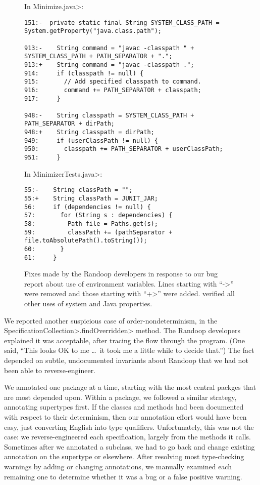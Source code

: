 \begin{figure}

\noindent
In \<Minimize.java>:

\begin{Verbatim}
151:-  private static final String SYSTEM_CLASS_PATH = System.getProperty("java.class.path");

913:-    String command = "javac -classpath " + SYSTEM_CLASS_PATH + PATH_SEPARATOR + ".";
913:+    String command = "javac -classpath .";
914:     if (classpath != null) {
915:       // Add specified classpath to command.
916:       command += PATH_SEPARATOR + classpath;
917:     }

948:-    String classpath = SYSTEM_CLASS_PATH + PATH_SEPARATOR + dirPath;
948:+    String classpath = dirPath;
949:     if (userClassPath != null) {
950:       classpath += PATH_SEPARATOR + userClassPath;
951:     }
\end{Verbatim}

\noindent
In \<MinimizerTests.java>:

\begin{Verbatim}
55:-    String classPath = "";
55:+    String classPath = JUNIT_JAR;
56:     if (dependencies != null) {
57:       for (String s : dependencies) {
58:         Path file = Paths.get(s);
59:         classPath += (pathSeparator + file.toAbsolutePath().toString());
60:       }
61:     }
\end{Verbatim}

\caption{Fixes made by the Randoop developers in response to our bug report
  about use of environment variables.  Lines starting with ``\<->'' were
  removed and those starting with ``\<+>'' were added.
  \TheDeterminismChecker verified all other uses of system and Java properties.}
\label{fig:randoop-bug-getenv}
\end{figure}


We reported another suspicious case of order-nondeterminism, in the
\<SpecificationCollection>\-\<.findOverridden> method.  The Randoop developers explained it was
acceptable, after tracing the flow through the program.  (One said, ``This
looks OK to me \ldots\ it took me a little while to decide that.'')  The fact
depended on subtle, undocumented invariants about Randoop that we had not
been able to reverse-engineer.


We annotated one package at a time, starting with the most central packges
that are most depended upon.  Within a package, we followed a similar
strategy, annotating supertypes first.  If the classes and methods had been
documented with respect to their determinism, then our annotation effort
would have been easy, just converting English into type qualifiers.
Unfortunately, this was not the case: we reverse-engineered each
specification, largely from the methods it calls.  Sometimes after we
annotated a subclass, we had to go back and change existing annotation on
the supertype or elsewhere.
After resolving most type-checking warnings by adding or changing
annotations, we manually examined each remaining one to determine whether
it was a bug or a false positive warning.




